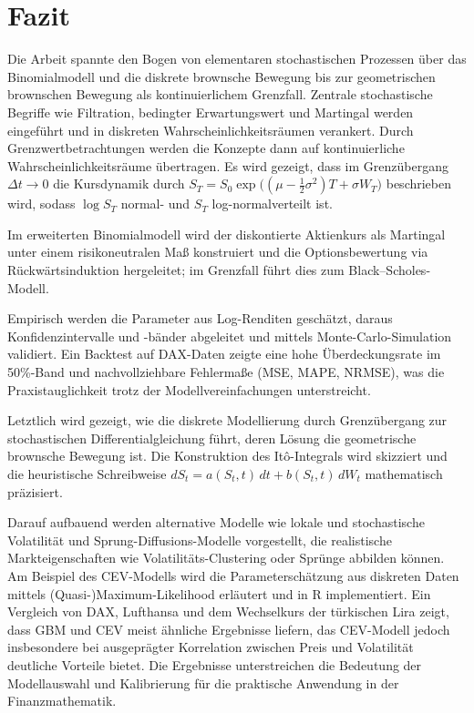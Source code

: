 \section{Fazit}

Die Arbeit spannte den Bogen von elementaren stochastischen Prozessen über das Binomialmodell und die diskrete brownsche 
Bewegung bis zur geometrischen brownschen Bewegung als kontinuierlichem Grenzfall. Zentrale stochastische Begriffe wie 
Filtration, bedingter Erwartungswert und Martingal werden eingeführt und in diskreten Wahrscheinlichkeitsräumen verankert. 
Durch Grenzwertbetrachtungen werden die Konzepte dann auf kontinuierliche Wahrscheinlichkeitsräume übertragen. Es wird gezeigt, dass im Grenzübergang $\Delta t \to 0$ die Kursdynamik durch
$S_T = S_0 \exp\!\big((\mu - \tfrac12\sigma^2)T + \sigma W_T\big)$
beschrieben wird, sodass $\log S_T$ normal- und $S_T$ log-normalverteilt ist. 

Im erweiterten Binomialmodell wird der diskontierte Aktienkurs als Martingal unter einem risikoneutralen Maß konstruiert und die Optionsbewertung 
via Rückwärtsinduktion hergeleitet; im Grenzfall führt dies zum Black–Scholes-Modell.

Empirisch werden die Parameter aus 
Log-Renditen geschätzt, daraus Konfidenzintervalle und -bänder abgeleitet und mittels Monte-Carlo-Simulation validiert. 
Ein Backtest auf DAX-Daten zeigte eine hohe Überdeckungsrate im 50\%-Band und nachvollziehbare Fehlermaße (MSE, MAPE, NRMSE), 
was die Praxistauglichkeit trotz der Modellvereinfachungen unterstreicht. 

Letztlich wird gezeigt, wie die diskrete Modellierung durch Grenzübergang zur stochastischen Differentialgleichung führt, deren Lösung die 
geometrische brownsche Bewegung ist. Die Konstruktion des Itô-Integrals wird skizziert und die 
heuristische Schreibweise $dS_t = a(S_t,t)\,dt + b(S_t,t)\,dW_t$ mathematisch präzisiert.

Darauf aufbauend werden alternative Modelle wie lokale und stochastische Volatilität und Sprung-Diffusions-Modelle vorgestellt, die realistische Markteigenschaften wie Volatilitäts-Clustering oder Sprünge abbilden können. 
Am Beispiel des CEV-Modells wird die Parameterschätzung aus diskreten Daten mittels (Quasi-)Maximum-Likelihood 
erläutert und in R implementiert. Ein Vergleich von DAX, Lufthansa und dem Wechselkurs der türkischen Lira zeigt, dass GBM und CEV meist ähnliche Ergebnisse liefern, das CEV-Modell jedoch insbesondere bei ausgeprägter Korrelation zwischen Preis und Volatilität deutliche Vorteile bietet. Die Ergebnisse unterstreichen die Bedeutung der
 Modellauswahl und Kalibrierung für die praktische Anwendung in der Finanzmathematik.


